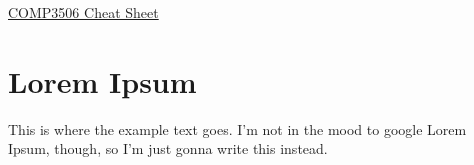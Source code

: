\documentclass[landscape]{cheat}
\begin{document}
\footnotesize
\begin{multicols}{3}

\begin{center}
\Large{\underline{COMP3506 Cheat Sheet}} \\
\end{center}

\section{Lorem Ipsum}
This is where the example text goes.
I'm not in the mood to google Lorem Ipsum, though, so I'm just gonna write this instead.

\end{multicols}
\end{document}
